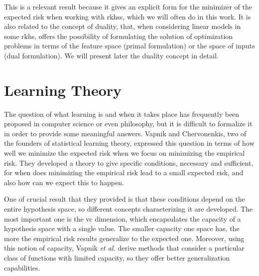 This is a relevant result because it gives an explicit form for the minimizer of the expected risk when working with \acrshort{rkhss}, which we will often do in this work. It is also related to the concept of duality, that, when considering linear models in some \acrshort{rkhs}, offers the possibility of formulating the solution of optimization problems in terms of the feature space (primal formulation) or the space of inputs (dual formulation). We will present later the duality concept in detail. 



















\section{Learning Theory}
% 
%




The question of what learning is and when it takes place has frequently been proposed in computer science or even philosophy, but it is difficult to formalize it in order to provide some meaningful answers. Vapnik and Chervonenkis, two of the founders of statistical learning theory, expressed this question in terms of how well we minimize the expected risk when we focus on minimizing the empirical risk.
%
They developed a theory to give specific conditions, necessary and sufficient, for when does minimizing the empirical risk lead to a small expected risk, and also how can we expect this to happen.

%
One of crucial result that they provided is that these conditions depend on the entire hypothesis space, so different concepts characterizing it are developed. The most important one is the \acrfull{vc} dimension, which encapsulates the capacity of a hypothesis space with a single value. The smaller capacity one space has, the more the empirical risk results generalize to the expected one.
%
Moreover, using this notion of capacity, Vapnik \emph{et al.} derive methods that consider a particular class of functions with limited capacity, so they offer better generalization capabilities.


